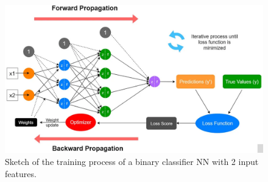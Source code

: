 \begin{figure}[h!]
    \vspace{-0.8cm}
    \centering
    \includegraphics[width=0.95\linewidth]{fig/chap05-stats/dnn.png}
    \caption{Sketch of the training process of a binary classifier NN with 2 input features.}
    \label{fig:dnn}
\end{figure}




